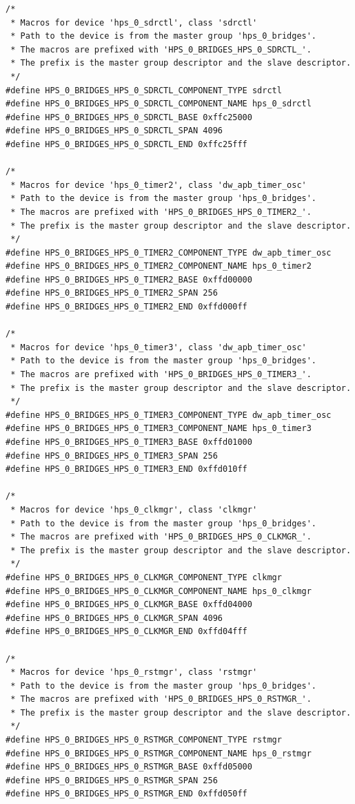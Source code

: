 \documentclass[conference]{IEEEtran}
\begin{document}
\begin{lstlisting}
/*
 * Macros for device 'hps_0_sdrctl', class 'sdrctl'
 * Path to the device is from the master group 'hps_0_bridges'.
 * The macros are prefixed with 'HPS_0_BRIDGES_HPS_0_SDRCTL_'.
 * The prefix is the master group descriptor and the slave descriptor.
 */
#define HPS_0_BRIDGES_HPS_0_SDRCTL_COMPONENT_TYPE sdrctl
#define HPS_0_BRIDGES_HPS_0_SDRCTL_COMPONENT_NAME hps_0_sdrctl
#define HPS_0_BRIDGES_HPS_0_SDRCTL_BASE 0xffc25000
#define HPS_0_BRIDGES_HPS_0_SDRCTL_SPAN 4096
#define HPS_0_BRIDGES_HPS_0_SDRCTL_END 0xffc25fff

/*
 * Macros for device 'hps_0_timer2', class 'dw_apb_timer_osc'
 * Path to the device is from the master group 'hps_0_bridges'.
 * The macros are prefixed with 'HPS_0_BRIDGES_HPS_0_TIMER2_'.
 * The prefix is the master group descriptor and the slave descriptor.
 */
#define HPS_0_BRIDGES_HPS_0_TIMER2_COMPONENT_TYPE dw_apb_timer_osc
#define HPS_0_BRIDGES_HPS_0_TIMER2_COMPONENT_NAME hps_0_timer2
#define HPS_0_BRIDGES_HPS_0_TIMER2_BASE 0xffd00000
#define HPS_0_BRIDGES_HPS_0_TIMER2_SPAN 256
#define HPS_0_BRIDGES_HPS_0_TIMER2_END 0xffd000ff

/*
 * Macros for device 'hps_0_timer3', class 'dw_apb_timer_osc'
 * Path to the device is from the master group 'hps_0_bridges'.
 * The macros are prefixed with 'HPS_0_BRIDGES_HPS_0_TIMER3_'.
 * The prefix is the master group descriptor and the slave descriptor.
 */
#define HPS_0_BRIDGES_HPS_0_TIMER3_COMPONENT_TYPE dw_apb_timer_osc
#define HPS_0_BRIDGES_HPS_0_TIMER3_COMPONENT_NAME hps_0_timer3
#define HPS_0_BRIDGES_HPS_0_TIMER3_BASE 0xffd01000
#define HPS_0_BRIDGES_HPS_0_TIMER3_SPAN 256
#define HPS_0_BRIDGES_HPS_0_TIMER3_END 0xffd010ff

/*
 * Macros for device 'hps_0_clkmgr', class 'clkmgr'
 * Path to the device is from the master group 'hps_0_bridges'.
 * The macros are prefixed with 'HPS_0_BRIDGES_HPS_0_CLKMGR_'.
 * The prefix is the master group descriptor and the slave descriptor.
 */
#define HPS_0_BRIDGES_HPS_0_CLKMGR_COMPONENT_TYPE clkmgr
#define HPS_0_BRIDGES_HPS_0_CLKMGR_COMPONENT_NAME hps_0_clkmgr
#define HPS_0_BRIDGES_HPS_0_CLKMGR_BASE 0xffd04000
#define HPS_0_BRIDGES_HPS_0_CLKMGR_SPAN 4096
#define HPS_0_BRIDGES_HPS_0_CLKMGR_END 0xffd04fff

/*
 * Macros for device 'hps_0_rstmgr', class 'rstmgr'
 * Path to the device is from the master group 'hps_0_bridges'.
 * The macros are prefixed with 'HPS_0_BRIDGES_HPS_0_RSTMGR_'.
 * The prefix is the master group descriptor and the slave descriptor.
 */
#define HPS_0_BRIDGES_HPS_0_RSTMGR_COMPONENT_TYPE rstmgr
#define HPS_0_BRIDGES_HPS_0_RSTMGR_COMPONENT_NAME hps_0_rstmgr
#define HPS_0_BRIDGES_HPS_0_RSTMGR_BASE 0xffd05000
#define HPS_0_BRIDGES_HPS_0_RSTMGR_SPAN 256
#define HPS_0_BRIDGES_HPS_0_RSTMGR_END 0xffd050ff


\end{lstlisting}
\end{document}
